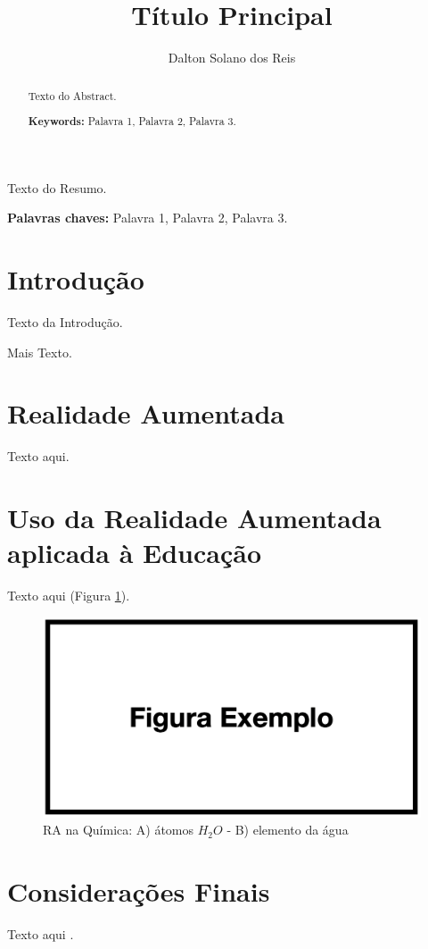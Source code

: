 \documentclass[12pt]{article}
\title{Título Principal}
\author{Dalton Solano dos Reis\inst{1}}
\begin{document}
 
\makeatletter
\renewcommand{\@cite}[2]{({#1\if@tempswa , #2\fi})}
\makeatother


\maketitle

\begin{abstract}
Texto do Abstract.

\textbf{Keywords:} Palavra 1, Palavra 2, Palavra 3.
\end{abstract}
     
\begin{resumo} 
Texto do Resumo.

\textbf{Palavras chaves:} Palavra 1, Palavra 2, Palavra 3.
\end{resumo}

\section{Introdução} \label{sec:introducao}

Texto da Introdução. 

Mais Texto.

\section{Realidade Aumentada} \label{sec:aumentada}

Texto aqui.  

\section{Uso da Realidade Aumentada aplicada à Educação}\label{sec:aplicada}

Texto aqui (Figura \ref{fig:Fig_Cavalli2024}).

\begin{figure}[ht]
\centering
\includegraphics[width=.99\textwidth]{figura.png}
\caption{RA na Química: A) átomos $H_2O$ - B) elemento da água}
\label{fig:Fig_Cavalli2024}
\end{figure}

\section{Considerações Finais}\label{sec:finais}

Texto aqui \cite{Teste2025}.



\end{document}

